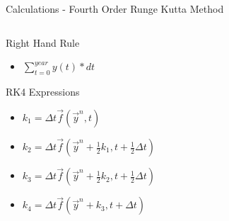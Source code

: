 \documentclass{beamer}  %
\begin{document}
\begin{frame}{Calculations - Fourth Order Runge Kutta Method}

\begin{columns} %

 \begin{column}{0.50\textwidth} %
  	\begin{block}{Right Hand Rule} 
   		 \begin{itemize}
     		 \item $\sum_{t=0}^{year}y(t)*dt$
   		 \end{itemize}
   	\end{block}
	
	\begin{block}{RK4 Expressions} %
    \begin{itemize}
      \item $k_{1}= \Delta t\vec{f}(\vec{y}^{n},t)$
      \item $k_{2}= \Delta t\vec{f}(\vec{y}^{n} + \frac{1}{2}k_{1},t + \frac{1}{2}\Delta t)$
      \item $k_{3}= \Delta t\vec{f}(\vec{y}^{n} + \frac{1}{2}k_{2},t + \frac{1}{2}\Delta t)$
      \item $k_{4}= \Delta t\vec{f}(\vec{y}^{n} + k_{3}, t + \Delta t)$
    \end{itemize}
  \end{block}
 \end{column}

 \begin{column}{0.50\textwidth} %


\end{column}
\end{columns}
\end{frame}
\end{document}
